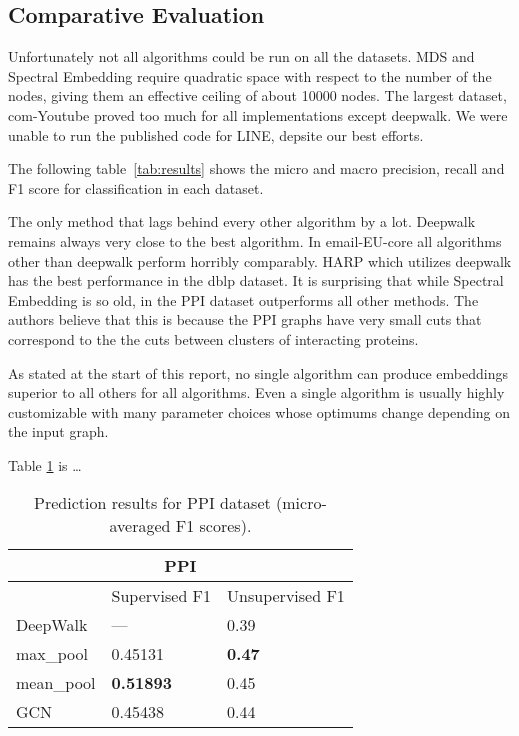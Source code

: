 \subsection{Comparative Evaluation}

Unfortunately not all algorithms could be run on all the datasets. MDS and Spectral Embedding
require quadratic space with respect to the number of the nodes, giving them an effective ceiling of
about 10000 nodes. The largest dataset, com-Youtube proved too much for all implementations except
deepwalk. We were unable to run the published code for LINE, depsite our best efforts.

The following table~\ref{tab:results} shows the micro and macro precision, recall and F1 score for
classification in each dataset.



The only method that lags behind every other algorithm by a lot. Deepwalk remains always very close
to the best algorithm. In email-EU-core all algorithms other than deepwalk perform horribly
comparably. HARP which utilizes deepwalk has the best performance in the dblp dataset. It is
surprising that while Spectral Embedding is so old, in the PPI dataset outperforms all other
methods. The authors believe that this is because the PPI graphs have very small cuts that
correspond to the the cuts between clusters of interacting proteins.

As stated at the start of this report, no single algorithm can produce embeddings superior to all
others for all algorithms. Even a single algorithm is usually highly customizable with many
parameter choices whose optimums change depending on the input graph.



Table \ref{table:1} is \dots
\begin{table}[h!]
\centering
\caption{Prediction results for PPI dataset (micro-averaged F1 scores). \newline}
\begin{tabular}{|p{3cm}||p{3cm}|p{3cm}|}
 \hline
 \multicolumn{3}{|c|}{\textbf{PPI}} \\
 \hline
 & Supervised F1 &Unsupervised F1\\
 \hline\hline
 DeepWalk   & ---    &0.39\\
 max\_pool &   0.45131  & \textbf{0.47} \\
 mean\_pool &\textbf{0.51893} & 0.45\\
 GCN    &0.45438 & 0.44\\
 \hline
\end{tabular}\\
\label{table:1}
\end{table}

